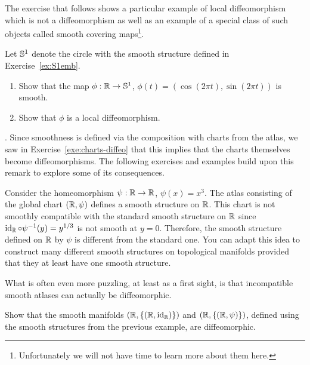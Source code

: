 The exercise that follows shows a particular example of local diffeomorphism which is not a diffeomorphism as well as an example of a special class of such objects called smooth covering maps\footnote{Unfortunately we will not have time to learn more about them here.}.

\begin{exercise}
	Let $\mathbb{S}^1$ denote the circle with the smooth structure defined in Exercise~\ref{ex:S1emb}.
	\begin{enumerate}
		\item Show that the map $\phi: \mathbb{R} \to \mathbb{S}^1$, $\phi(t) = (\cos(2\pi t), \sin(2\pi t))$ is smooth.
		\item Show that $\phi$ is a local diffeomorphism.
	\end{enumerate}
\end{exercise}

. Since smoothness is defined via the composition with charts from the atlas,
we saw in Exercise~\ref{exe:charts-diffeo} that this implies that the charts themselves become diffeomorphisms.
The following exercises and examples build upon this remark to explore some of its consequences.

\begin{example}
	Consider the homeomorphism $\psi:\mathbb{R}\to\mathbb{R}$, $\psi(x) = x^3$.
	The atlas consisting of the global chart $(\mathbb{R}, \psi)$ defines a smooth structure on $\mathbb{R}$.
	This chart is not smoothly compatible with the standard smooth structure on $\mathbb{R}$ since $\operatorname{id}_{\mathbb{R}} \circ \psi^{-1} (y) = y^{1/3}$ is not smooth at $y=0$.
	Therefore, the smooth structure defined on $\mathbb{R}$ by $\psi$ is different from the standard one.
	You can adapt this idea to construct many different smooth structures on topological manifolds provided that they at least have one smooth structure.
\end{example}

What is often even more puzzling, at least as a first sight, is that incompatible smooth atlases can actually be diffeomorphic.

\begin{exercise}
	Show that the smooth manifolds $(\mathbb{R}, \{(\mathbb{R}, \operatorname{id}_{\mathbb{R}})\})$ and $(\mathbb{R}, \{(\mathbb{R}, \psi)\})$, defined using the smooth structures from the previous example, are diffeomorphic.
\end{exercise}

